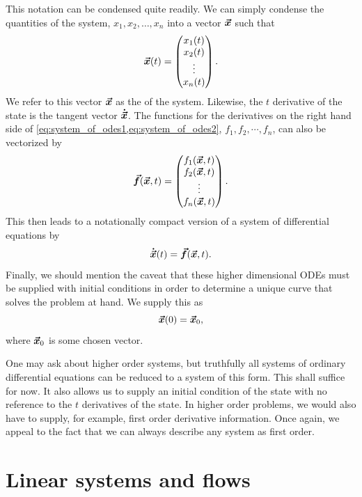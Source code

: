         This notation can be condensed quite readily. We can simply condense the quantities of the system, $x_1,x_2,\dots,x_n$ into a vector $\boldsymbol{\vec{x}}$ such that
    \begin{equation}
    \label{eq:state}
        \boldsymbol{\vec{x}}(t) = \begin{pmatrix} x_1(t) \\ x_2(t) \\ \vdots \\ x_n(t) \end{pmatrix}.
    \end{equation}
     We refer to this vector $\boldsymbol{\vec{x}}$ as the  of the system. Likewise, the $t$ derivative of the state is the tangent vector $\boldsymbol{\dot{\vec{x}}}$. The functions for the derivatives on the right hand side of  \cref{eq:system_of_odes1,eq:system_of_odes2}, $f_1,f_2,\cdots,f_n$, can also be vectorized by
\begin{equation}
    \boldsymbol{\vec{f}}(\boldsymbol{\vec{x}},t) = \begin{pmatrix} f_1(\boldsymbol{\vec{x}},t) \\ f_2(\boldsymbol{\vec{x}},t) \\ \vdots \\ f_n(\boldsymbol{\vec{x}},t) \end{pmatrix}.
\end{equation}
This then leads to a notationally compact version of a system of differential equations by
\begin{equation}
\label{eq:first_order_system}
\boldsymbol{\dot{\vec{x}}}(t) = \boldsymbol{\vec{f}}(\boldsymbol{\vec{x}},t).
\end{equation}
Finally, we should mention the caveat that these higher dimensional ODEs must be supplied with initial conditions in order to determine a unique curve that solves the problem at hand. We supply this as
\begin{equation}
\boldsymbol{\vec{x}}(0)=\boldsymbol{\vec{x}}_0,
\end{equation}
where $\boldsymbol{\vec{x}}_0$ is some chosen vector.

One may ask about higher order systems, but truthfully all systems of ordinary differential equations can be reduced to a system of this form. This shall suffice for now. It also allows us to supply an initial condition of the state with no reference to the $t$ derivatives of the state. In higher order problems, we would also have to supply, for example, first order derivative information. Once again, we appeal to the fact that we can always describe any system as first order.


 
\section{Linear systems and flows}
        
